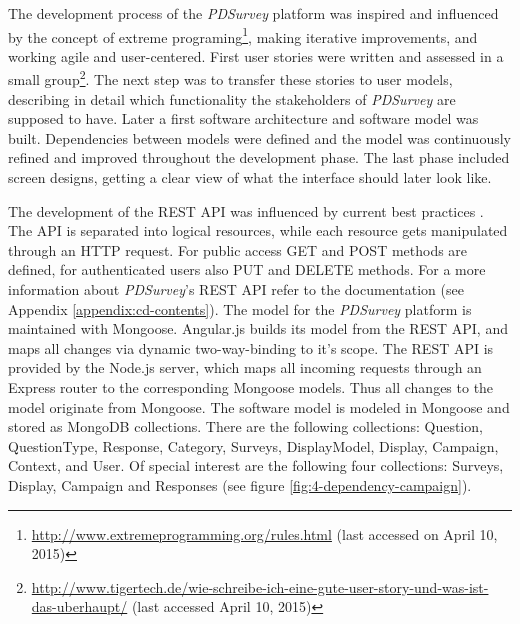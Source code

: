 	The development process of the \textit{PDSurvey} platform was inspired and influenced by the concept of extreme programing\footnote{\url{http://www.extremeprogramming.org/rules.html} (last accessed on April 10, 2015)}, making iterative improvements, and working agile and user-centered. First user stories were written and assessed in a small group\footnote{\url{http://www.tigertech.de/wie-schreibe-ich-eine-gute-user-story-und-was-ist-das-uberhaupt/} (last accessed April 10, 2015)}. The next step was to transfer these stories to user models, describing in detail which functionality the stakeholders of \textit{PDSurvey} are supposed to have. Later a first software architecture and software model was built. Dependencies between models were defined and the model was continuously refined and improved throughout the development phase. The last phase included screen designs, getting a clear view of what the interface should later look like.

	The development of the REST API was influenced by current best practices \cite{Sahni2015RESTAPI, TutsPlus2015RESTAPI, hughes2012einfuhrung}. The API is separated into logical resources, while each resource gets manipulated through an HTTP request. For public access GET and POST methods are defined, for authenticated users also PUT and DELETE methods. For a more information about \textit{PDSurvey}'s REST API refer to the documentation (see Appendix \ref{appendix:cd-contents}).
	The model for the \textit{PDSurvey} platform is maintained with Mongoose. Angular.js builds its model from the REST API, and maps all changes via dynamic two-way-binding to it's scope. The REST API is provided by the Node.js server, which maps all incoming requests through an Express router to the corresponding Mongoose models. Thus all changes to the model originate from Mongoose.
	The software model is modeled in Mongoose and stored as MongoDB collections. There are the following collections: Question, QuestionType, Response, Category, Surveys, DisplayModel, Display, Campaign, Context, and User. 
	Of special interest are the following four collections: Surveys, Display, Campaign and Responses (see figure \ref{fig:4-dependency-campaign}).




